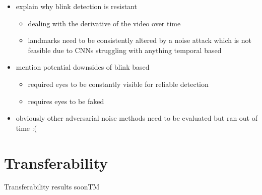 \begin{itemize}
    \item explain why blink detection is resistant
    \begin{itemize}
        \item dealing with the derivative of the video over time
        \item landmarks need to be consistently altered by a noise attack which is not feasible due to CNNs struggling with anything temporal based
    \end{itemize}
    \item mention potential downsides of blink based
    \begin{itemize}
        \item required eyes to be constantly visible for reliable detection
        \item requires eyes to be faked
    \end{itemize}
    \item obviously other adversarial noise methods need to be evaluated but ran out of time :(
\end{itemize}

\section{Transferability}

{\huge Transferability results soonTM}